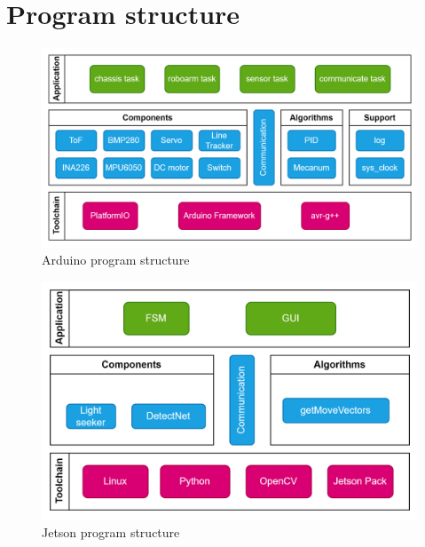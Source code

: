 \documentclass{article}
\begin{document}
\newpage 



\newpage 



\newpage

\section{Program structure}
\begin{figure}[H]
    \centering
    \includegraphics[width=\linewidth]{asset/elec3848_ard_framework.png}
    \caption{Arduino program structure}
    \label{fig:ard_prgm_struct}
\end{figure}

\begin{figure}[H]
    \centering
    \includegraphics[width=\linewidth]{asset/jetson_struct.png}
    \caption{Jetson program structure}
    \label{fig:jet_prgm_struct}
\end{figure}

\newpage




\newpage

\newpage 



% 
% 
% 
\end{document}
